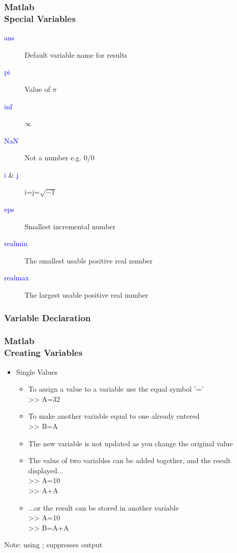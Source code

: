 \documentclass[hyperref={pdfpagelabels=true}]{beamer}
\begin{document}
\begin{frame}
\frametitle{Matlab \\ {\small Special Variables }}
\begin{description}
\item[\textcolor{blue}{ans}] Default variable name for results
\item[\textcolor{blue}{pi}] Value of $\pi$
\item[\textcolor{blue}{inf}] $\infty$
\item[\textcolor{blue}{NaN}] Not a number e.g. 0/0
\item[\textcolor{blue}{i} \& \textcolor{blue}{j}] i=j=$\sqrt{-1}$
\item[\textcolor{blue}{eps}] Smallest incremental number
\item[\textcolor{blue}{realmin}] The smallest usable positive real number
\item[\textcolor{blue}{realmax}] The largest usable positive real number
\end{description}
\end{frame}


\subsubsection{Variable Declaration}
\begin{frame}
\frametitle{Matlab \\ {\small Creating Variables}}
\begin{itemize}
\item Single Values
  \begin{itemize}
  \item To assign a value to a variable use the equal symbol '=' \\ >> \textcolor{mygreen}{A=32}
  \item To make another variable equal to one already entered \\ >> \textcolor{mygreen}{B=A}
  \item The new variable is not updated as you change the original value
  \item The value of two variables can be added together, and the result displayed... \\ >> \textcolor{mygreen}{A=10} \\>> \textcolor{mygreen}{A+A}
  \item ...or the result can be stored in another variable \\>> \textcolor{mygreen}{A=10} \\ >> \textcolor{mygreen}{B=A+A}
  \end{itemize}
\end{itemize}
\noindent\makebox[\linewidth]{\rule{10 cm}{0.1pt}}
Note: using ; suppresses output
\end{frame}
\end{document}
